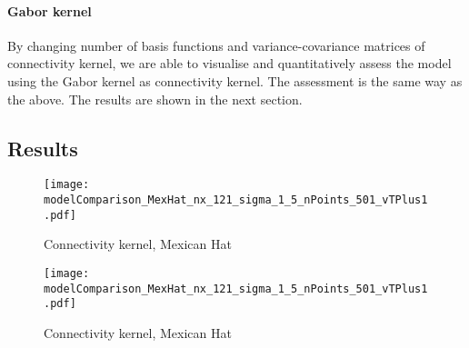\documentclass[a4paper, 12pt, english]{article}
\begin{document}
\paragraph{Gabor kernel\newline}
By changing number of basis functions and variance-covariance matrices of
connectivity kernel, we are able to visualise and quantitatively assess the model
using the Gabor kernel as connectivity kernel. The assessment is the same way as the above.
The results are shown in the next section.


\subsection{Results}

\begin{figure}[H]
\centering
\texttt{[image: modelComparison\_MexHat\_nx\_121\_sigma\_1\_5\_nPoints\_501\_vTPlus1.pdf]}
\caption{Connectivity kernel, Mexican Hat}
\end{figure}

\begin{figure}[H]
\centering
\texttt{[image: modelComparison\_MexHat\_nx\_121\_sigma\_1\_5\_nPoints\_501\_vTPlus1.pdf]}
\caption{Connectivity kernel, Mexican Hat}
\end{figure}
\end{document}
